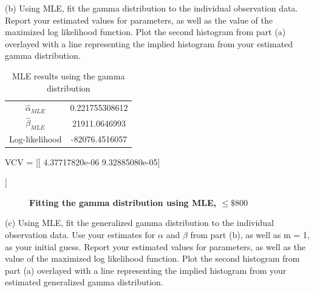 \documentclass[letterpaper,12pt]{article}
\theoremstyle{definition}
\begin{document}
\noindent(b) Using MLE, fit the gamma distribution to the individual observation data. Report your estimated values for parameters, as well as the value of the maximized log likelihood function. Plot the second histogram from part (a) overlayed with a line representing the implied histogram from your estimated gamma distribution.
\par\bigskip

\begin{table}[h!]
 \centering
 \caption{MLE results using the gamma distribution}
 \begin{tabular}{|c | c |} 
  \hline
  $\hat{\alpha}_{MLE}$ & 0.221755308612 \\ 
  $\hat{\beta}_{MLE}$ & 21911.0646993\\
  Log-likelihood & -82076.4516057\\
  \hline
  \end{tabular}
\end{table}
\par
VCV =  [[  4.37717820e-06   9.32885080e-05]\par
 [  9.32885080e-05   1.00000060e+00]]
\par

\begin{figure}[H]\centering\captionsetup{width=4.0in}
  \caption{\textbf{Fitting the gamma distribution using MLE, $\leq \$800$}}
\end{figure}
\par\bigskip

\noindent(c) Using MLE, fit the generalized gamma distribution to the individual observation data. Use your estimates for $\alpha$ and $\beta$ from part (b), as well as m = 1, as your initial guess. Report your estimated values for parameters, as well as the value of the maximized log likelihood function. Plot the second histogram from part (a) overlayed with a line representing the implied histogram from your estimated generalized gamma distribution.
\par\bigskip
\end{document}
